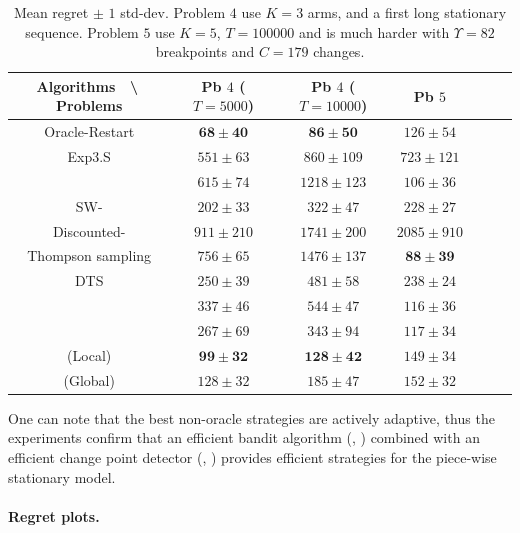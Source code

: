 \begin{table}[ht]
    \centering
    \begin{tabular}{c|cccccc}
        \textbf{Algorithms} $\;$ \textbackslash $\;$ \textbf{Problems} & Pb $4$ ($T=5000$) & Pb $4$ ($T=10000$) & Pb $5$ \\
        \hline
        Oracle-Restart \klUCB{} & $\mathbf{68 \pm 40}$ & $\mathbf{86 \pm 50}$ & $126 \pm 54$ \\
        \hline
        Exp3.S & $551 \pm 63$ & $860 \pm 109$ & $723 \pm 121$ \\
        \hline
        \klUCB{} & $615 \pm 74$ & $1218 \pm 123$ & $106 \pm 36$ \\
        SW-\klUCB{} & $202 \pm 33$ & $322 \pm 47$ & $228 \pm 27$ \\
        Discounted-\klUCB{} & $911 \pm 210$ & $1741 \pm 200$ & $2085 \pm 910$ \\
        \hline
        Thompson sampling & $756 \pm 65$ & $1476 \pm 137$ & $\mathbf{88 \pm 39}$ \\
        DTS & $250 \pm 39$ & $481 \pm 58$ & $238 \pm 24$ \\
        \hline
        \MklUCB{} & $337 \pm 46$ & $544 \pm 47$ & $116 \pm 36$ \\
        \CUSUMklUCB{} & $267 \pm 69$ & $343 \pm 94$ & $117 \pm 34$ \\
        \hline
        \GLRklUCB{}(Local) & $\mathbf{99 \pm 32}$ & $\mathbf{128 \pm 42}$ & $149 \pm 34$ \\
        \GLRklUCB{}(Global) & $128 \pm 32$ & $185 \pm 47$ & $152 \pm 32$
    \end{tabular}
    \caption{Mean regret $\pm$ $1$ std-dev. Problem $4$ use $K=3$ arms, and a first long stationary sequence. Problem $5$ use $K=5$, $T=100000$ and is much harder with $\Upsilon=82$ breakpoints and $C=179$ changes.}
    \label{table:6:totalResults2}
\end{table}

One can note that the best non-oracle strategies are actively adaptive,
thus the experiments confirm that an efficient bandit algorithm (\eg, \klUCB) combined with an efficient change point detector (\eg, \GLR) provides efficient strategies for the piece-wise stationary model.


\paragraph{Regret plots.}
\label{subsub:6:regretPlots}

